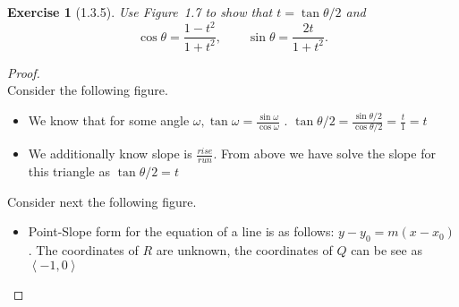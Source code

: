 \documentclass[10pt]{article}
\theoremstyle{plain}
\newtheorem{ex}{Exercise}
\begin{document}
\hrulefill

\begin{ex} [1.3.5]
  Use Figure~1.7 to show that $\displaystyle t=\tan\theta/2$ and
  \[
    \cos\theta=\frac{1-t^2}{1+t^2},\qquad\sin\theta=\frac{2t}{1+t^2}.
  \]
\end{ex}

\begin{proof} 
  \ \\
  Consider the following figure. \\
  \begin{center}
  \end{center}
  \begin{itemize}
    \item We know that for some angle $\displaystyle \omega, \tan{\omega} = \frac{\sin{\omega}}{\cos\omega}$ .
    \subitem $\displaystyle \tan{\theta/2} = \frac{\sin{\theta/2}}{\cos\theta/2} = \frac{t}{1} = t$ 
    \item We additionally know slope is $\displaystyle \frac{rise}{run}$.
    \subitem From above we have solve the slope for this triangle as $\displaystyle \tan{\theta/2} = t$
  \end{itemize}
  Consider next the following figure. \\
  \begin{center}
  \end{center}
  \begin{itemize}
    \item Point-Slope form for the equation of a line is as follows: $y-y_{0} = m(x-x_{0})$.
    \subitem The coordinates of $R$ are unknown, the coordinates of $Q$ can be see as $\left< -1,0 \right>$

\end{itemize}
\end{proof}
\end{document}
